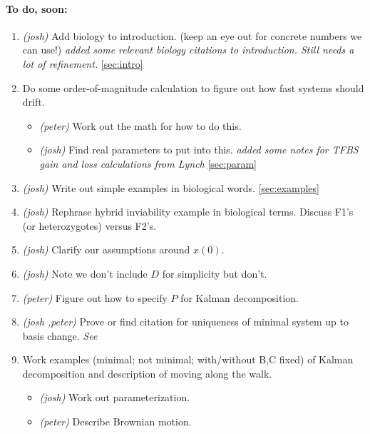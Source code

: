 \documentclass[11 pt]{article}
\newcommand{\jss}[1]{{\color{olive}\it #1}}
\begin{document}
\paragraph{To do, soon:}

\begin{enumerate}

  \item \emph{(josh)} Add biology to introduction. (keep an eye out for concrete numbers we can use!) \jss{added some relevant biology citations to introduction. Still needs a lot of refinement.} \ref{sec:intro}

    \item Do some order-of-magnitude calculation to figure out how fast systems should drift.
        \begin{itemize}
            \item \emph{(peter)} Work out the math for how to do this.
            \item \emph{(josh)} Find real parameters to put into this. 
              \jss{added some notes for TFBS gain and loss calculations from Lynch} \ref{sec:param}
        \end{itemize}

      \item \emph{(josh)} Write out simple examples in biological words. \ref{sec:examples}

    \item \emph{(josh)} Rephrase hybrid inviability example in biological terms.  Discuss F1's (or heterozygotes) versus F2's.

    \item \emph{(josh)} Clarify our assumptions around $x(0)$. 

    \item \emph{(josh)} Note we don't include $D$ for simplicity but don't.

    \item \emph{(peter)} Figure out how to specify $P$ for Kalman decomposition.

    \item \emph{(josh \jss{\checkmark},peter)} Prove or find citation for uniqueness of minimal system up to basis change. \jss{See \citep[Chapter 10.6, Theorem 6.9: Fundamental Theorem of Linear Realization Theory.]{kalman1969topics}}

    \item Work examples (minimal; not minimal; with/without B,C fixed) of Kalman decomposition and description of moving along the walk.
        \begin{itemize}
            \item \emph{(josh)} Work out parameterization.
            \item \emph{(peter)} Describe Brownian motion.
        \end{itemize}


\end{enumerate}
\end{document}
